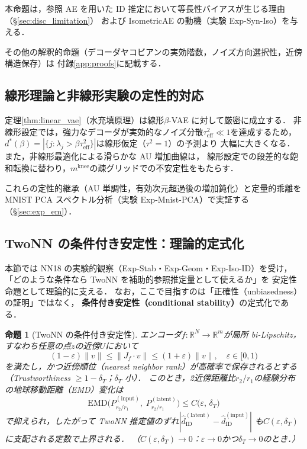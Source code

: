 \documentclass[11pt,a4paper]{jsarticle}
\newtheorem{proposition}{命題}
\newcommand{\R}{\mathbb{R}}
\newcommand{\mknee}{m^{\mathrm{knee}}}
\begin{document}
本命題は，参照 AE を用いた ID 推定において等長性バイアスが生じる理由（§\ref{sec:disc_limitation}）
および IsometricAE の動機（実験 Exp-Syn-Iso）を与える．

その他の解釈的命題（デコーダヤコビアンの実効階数，ノイズ方向選択性，近傍構造保存）は
付録\ref{app:proofs}に記載する．

\subsection{線形理論と非線形実験の定性的対応}\label{sec:theory_bridge}

定理\ref{thm:linear_vae}（水充填原理）は線形$\beta$-VAE に対して厳密に成立する．
非線形設定では，強力なデコーダが実効的なノイズ分散$\tau^2_\mathrm{eff} \ll 1$を達成するため，
$d^*(\beta) = |\{j : \lambda_j > \beta\tau^2_\mathrm{eff}\}|$は線形仮定（$\tau^2=1$）の予測より
大幅に大きくなる．また，非線形最適化による滑らかな AU 増加曲線は，
線形設定での段差的な飽和転換に替わり，$\mknee$の疎グリッドでの不安定性をもたらす．

これらの定性的継承（AU 単調性，有効次元超過後の増加鈍化）と定量的乖離を
MNIST PCA スペクトル分析（実験 Exp-Mnist-PCA）で実証する（§\ref{sec:exp_em}）．

\subsection{TwoNN の条件付き安定性：理論的定式化}\label{sec:theory_stability}

本節では NN18 の実験的観察（Exp-Stab・Exp-Geom・Exp-Iso-ID）を受け，
「どのような条件なら TwoNN を補助的参照推定量として使えるか」を
安定性命題として理論的に支える．
なお，ここで目指すのは「正確性（unbiasedness）の証明」ではなく，
\textbf{条件付き安定性（conditional stability）}の定式化である．

\begin{proposition}[TwoNN の条件付き安定性]\label{thm:twonn_stability}
エンコーダ$f: \R^N \to \R^m$が局所 bi-Lipschitz，
すなわち任意の点$z$の近傍$U$において
\begin{equation}
  (1-\varepsilon)\|v\| \leq \|J_f \cdot v\| \leq (1+\varepsilon)\|v\|,
  \quad \varepsilon \in [0,1)
  \label{eq:bilip}
\end{equation}
を満たし，かつ近傍順位（nearest neighbor rank）が高確率で保存されるとする
（Trustworthiness $\geq 1 - \delta_T$；$\delta_T$ 小）．
このとき，2近傍距離比$r_2/r_1$の経験分布の地球移動距離（EMD）変化は
\begin{equation}
  \mathrm{EMD}\bigl(P_{r_2/r_1}^{(\mathrm{input})},\; P_{r_2/r_1}^{(\mathrm{latent})}\bigr)
  \leq C\bigl(\varepsilon,\, \delta_T\bigr)
  \label{eq:twonn_stab}
\end{equation}
で抑えられ，したがって TwoNN 推定値のずれ$|\hat{d}_\mathrm{ID}^{(\mathrm{latent})} - \hat{d}_\mathrm{ID}^{(\mathrm{input})}|$
も$C(\varepsilon,\delta_T)$に支配される定数で上界される．
（$C(\varepsilon, \delta_T) \to 0$：$\varepsilon \to 0$かつ$\delta_T \to 0$のとき．）
\end{proposition}
\end{document}
